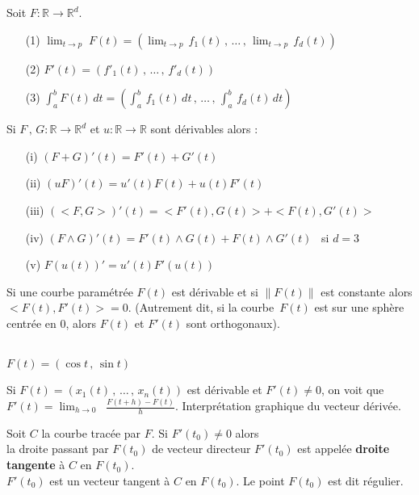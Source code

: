 \documentclass[12pt, class=report,crop=false]{standalone}
\begin{document}
\begin{definition}
Soit $F : \mathbb{R} \rightarrow \mathbb{R}^d$.
\begin{enumerate}
\item[(1)] $\displaystyle \lim_{t \rightarrow p} \;F(t) = \left( \lim_{t \rightarrow p} \,f_{1}(t) \,,\, \dots \,,\, \lim_{t \rightarrow p} \,f_{d}(t) \right)$
\item[(2)] $F'(t) = (f'_{1}(t) \,,\, \dots \,,\, f'_{d}(t))$
\item[(3)] $\displaystyle \int_{a}^b F(t)\, dt = \left(  \int_{a}^b\, f_{1}(t)\, dt \,,\, \dots \,,\, \int_{a}^b\, f_{d}(t)\, dt \right)$
\end{enumerate}
\end{definition}

\begin{theoreme}
Si $F\,,\, G :  \mathbb{R} \rightarrow \mathbb{R}^d$ et $u : \mathbb{R} \rightarrow \mathbb{R}$ sont dérivables alors :
\begin{enumerate}
\item[(i)] $(F + G)' (t) = F'(t) + G'(t)$
\item[(ii)] $(uF)' (t) = u'(t) F(t) + u(t) F'(t)$
\item[(iii)] $(<F , G>)' (t) = <F'(t), G(t)> + <F(t), G'(t)>$\item[(iv)] $(F \land G)' (t) = F'(t) \land G(t) + F(t) \land G'(t)$ \ si $d = 3$
\item[(v)] $F(u(t))' = u'(t) F'(u(t)) $
\end{enumerate}
\end{theoreme}



\begin{corollaire}
Si une courbe paramétrée $F(t)$ est dérivable et si $\|F(t)\|$ est constante alors $<F(t) , F'(t)> = 0$. 
(Autrement dit, si la courbe~$F(t)$ est sur une sph\`ere centrée en 0, alors $F(t)$ et $F'(t)$ sont orthogonaux).
\end{corollaire}


\\
$F(t) = (\cos t \,,\, \sin t)$ 






Si $F(t) = (x_{1}(t) \,,\, \dots \,,\,  x_{n}(t))$ est dérivable et $F'(t) \neq 0$, on voit que $F'(t) = \displaystyle \lim_{h\to 0}\;\; \frac{F(t + h) - F(t)}{h}$\;. Interprétation graphique du vecteur dérivée.


\begin{definition}
Soit $C$ la courbe tracée par $F$. %
Si $F'(t_{0}) \neq 0$ alors\\ la droite passant par $F(t_{0})$ de vecteur directeur $F'(t_{0})$ est appelée {\bf droite tangente} \`a $C$ en $F(t_{0})$.\\
 $F'(t_{0})$ est un vecteur tangent \`a $C$ en $F(t_{0})$.                      Le point $F(t_0)$ est dit régulier.
\end{definition}
\end{document}
